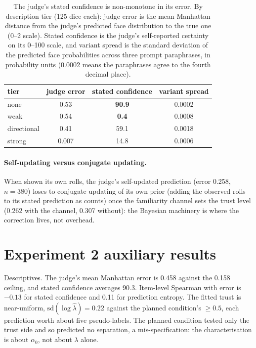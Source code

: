 \documentclass{article}
\begin{document}
\begin{table}[h]
  \caption{The judge's stated confidence is non-monotone in its error. By description tier
    (125 dice each): judge error is the mean Manhattan distance from the judge's predicted
    face distribution to the true one (0--2 scale). Stated confidence is the judge's
    self-reported certainty on its 0--100 scale, and variant spread is the standard deviation of
    the predicted face probabilities across three prompt paraphrases, in probability units
    (0.0002 means the paraphrases agree to the fourth decimal place).}
  \label{tab:confidence}
  \centering
  \small
  \begin{tabular}{lccc}
    \toprule
    tier & judge error & stated confidence & variant spread \\
    \midrule
    none        & 0.53  & \textbf{90.9} & 0.0002 \\
    weak        & 0.54  & \textbf{0.4}  & 0.0008 \\
    directional & 0.41  & 59.1          & 0.0018 \\
    strong      & 0.007 & 14.8          & 0.0006 \\
    \bottomrule
  \end{tabular}
\end{table}

\paragraph{Self-updating versus conjugate updating.}
When shown its own rolls, the judge's self-updated prediction (error 0.258, $n=380$) loses
to conjugate updating of its own prior (adding the observed rolls to its stated
prediction as counts) once the familiarity channel sets the trust level (0.262 with the
channel, 0.307 without): the Bayesian machinery is where the correction lives, not overhead.

\section{Experiment 2 auxiliary results}
\label{app:exp2}

Descriptives. The judge's mean Manhattan error is 0.458 against the 0.158
ceiling, and stated confidence averages 90.3. Item-level Spearman with error is
$-0.13$ for stated confidence and 0.11 for prediction entropy. The fitted trust
is near-uniform, $\mathrm{sd}(\log\hat\lambda) = 0.22$ against the planned
condition's $\ge 0.5$, each prediction worth about five pseudo-labels. The
planned condition tested only the trust side and so predicted no separation, a
mis-specification: the characterisation is about $\alpha_0$, not about
$\lambda$ alone.
\end{document}
